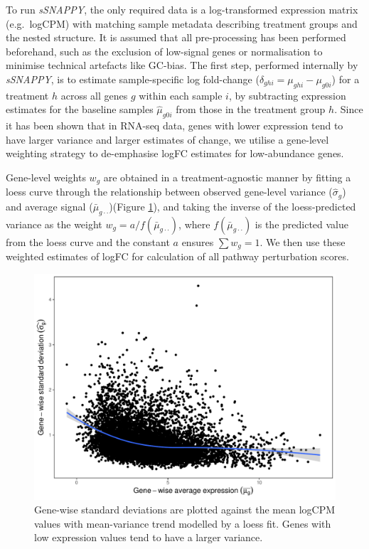 \documentclass[9pt,a4paper,]{extarticle}
\begin{document}
To run \emph{sSNAPPY}, the only required data is a log-transformed expression matrix (e.g.~logCPM) with matching sample metadata describing treatment groups and the nested structure.
It is assumed that all pre-processing has been performed beforehand, such as the exclusion of low-signal genes or normalisation to minimise technical artefacts like GC-bias.
The first step, performed internally by \emph{sSNAPPY}, is to estimate sample-specific log fold-change (\(\delta_{ghi} = \mu_{ghi} - \mu_{g0i}\)) for a treatment \(h\) across all genes \(g\) within each sample \(i\), by subtracting expression estimates for the baseline samples \(\hat\mu_{g0i}\) from those in the treatment group \(h\).
Since it has been shown that in RNA-seq data, genes with lower expression tend to have larger variance and larger estimates of change\citep{Law2014}, we utilise a gene-level weighting strategy to de-emphasise logFC estimates for low-abundance genes.

Gene-level weights \(w_g\) are obtained in a treatment-agnostic manner by fitting a loess curve through the relationship between observed gene-level variance (\(\widehat\sigma_g\)) and average signal (\(\bar\mu_{g\cdot\cdot}\))(Figure \ref{fig:Figure1}), and taking the inverse of the loess-predicted variance as the weight \(w_g = a / f(\bar\mu_{g\cdot\cdot})\), where \(f(\bar\mu_{g\cdot\cdot})\) is the predicted value from the loess curve and the constant \(a\) ensures \(\sum w_g = 1\).
We then use these weighted estimates of logFC for calculation of all pathway perturbation scores.

\begin{figure}

{\centering \includegraphics[width=1\linewidth]{sSNAPPY_paper_files/figure-latex/Figure1} 

}

\caption{Gene-wise standard deviations are plotted against the mean logCPM values with mean-variance trend modelled by a loess fit. Genes with low expression values tend to have a larger variance.}\label{fig:Figure1}
\end{figure}
\end{document}
